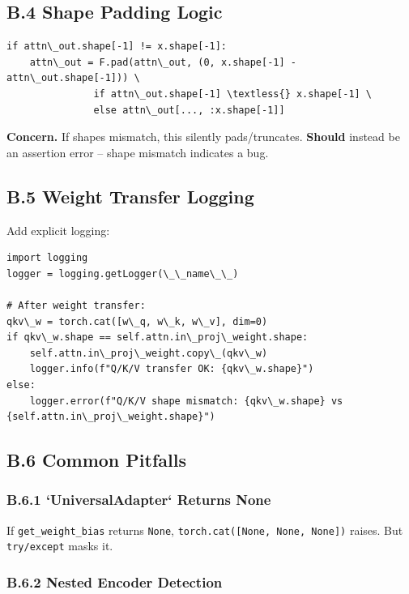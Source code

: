 \subsection{B.4 Shape Padding Logic}

\begin{lstlisting}
if attn\_out.shape[-1] != x.shape[-1]:
    attn\_out = F.pad(attn\_out, (0, x.shape[-1] - attn\_out.shape[-1])) \
               if attn\_out.shape[-1] \textless{} x.shape[-1] \
               else attn\_out[..., :x.shape[-1]]
\end{lstlisting}

\textbf{Concern.} If shapes mismatch, this silently pads/truncates. \textbf{Should} 
instead be an assertion error -- shape mismatch indicates a bug.

\subsection{B.5 Weight Transfer Logging}

Add explicit logging:

\begin{lstlisting}
import logging
logger = logging.getLogger(\_\_name\_\_)

# After weight transfer:
qkv\_w = torch.cat([w\_q, w\_k, w\_v], dim=0)
if qkv\_w.shape == self.attn.in\_proj\_weight.shape:
    self.attn.in\_proj\_weight.copy\_(qkv\_w)
    logger.info(f"Q/K/V transfer OK: {qkv\_w.shape}")
else:
    logger.error(f"Q/K/V shape mismatch: {qkv\_w.shape} vs {self.attn.in\_proj\_weight.shape}")
\end{lstlisting}

\subsection{B.6 Common Pitfalls}

\subsubsection{B.6.1 `UniversalAdapter` Returns None}

If \texttt{get\_weight\_bias} returns \texttt{None}, \texttt{torch.cat([None, None, None])} raises. 
But \texttt{try/except} masks it.

\subsubsection{B.6.2 Nested Encoder Detection}

